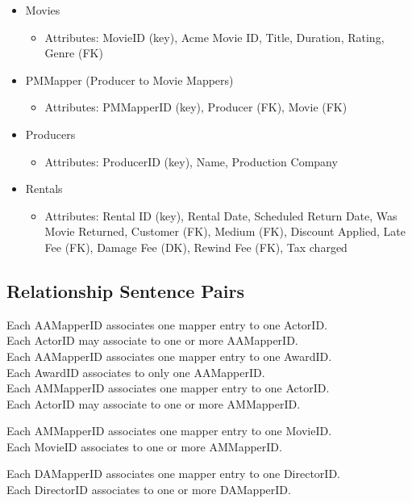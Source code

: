 \documentclass[letterpaper,12pt]{article}
\begin{document}
\begin{itemize}
\begin{itemize}
	      \end{itemize}
	\item Movies
	      \begin{itemize}
		      \item Attributes: MovieID (key), Acme Movie ID, Title, Duration, Rating, Genre (FK)
	      \end{itemize}
	\item PMMapper (Producer to Movie Mappers)
	      \begin{itemize}
		      \item Attributes: PMMapperID (key), Producer (FK), Movie (FK)
	      \end{itemize}
	\item Producers
	      \begin{itemize}
		      \item Attributes: ProducerID (key), Name, Production Company
	      \end{itemize}
	\item Rentals
	      \begin{itemize}
		      \item Attributes: Rental ID (key), Rental Date, Scheduled Return Date, Was Movie Returned, Customer (FK), Medium (FK), Discount Applied, Late Fee (FK), Damage Fee (DK), Rewind Fee (FK), Tax charged
	      \end{itemize}
\end{itemize}
\subsection{Relationship Sentence Pairs}
Each AAMapperID associates one mapper entry to one ActorID.\\
Each ActorID may associate to one or more AAMapperID.
\\
Each AAMapperID associates one mapper entry to one AwardID.\\
Each AwardID associates to only one AAMapperID.
\\
Each AMMapperID associates one mapper entry to one ActorID.\\
Each ActorID may associate to one or more AMMapperID.

Each AMMapperID associates one mapper entry to one MovieID.\\
Each MovieID associates to one or more AMMapperID.

Each DAMapperID associates one mapper entry to one DirectorID.\\
Each DirectorID associates to one or more DAMapperID.
\end{document}
